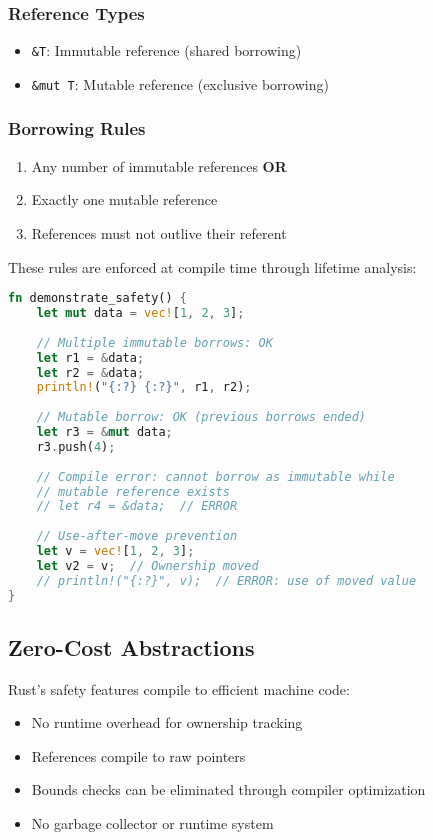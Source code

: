 \documentclass[11pt]{article}
\begin{document}
\subsubsection{Reference Types}
\begin{itemize}
    \item \texttt{\&T}: Immutable reference (shared borrowing)
    \item \texttt{\&mut T}: Mutable reference (exclusive borrowing)
\end{itemize}

\subsubsection{Borrowing Rules}
\begin{enumerate}
    \item Any number of immutable references \textbf{OR}
    \item Exactly one mutable reference
    \item References must not outlive their referent
\end{enumerate}

These rules are enforced at compile time through lifetime analysis:

\begin{lstlisting}[language=Rust,caption={Rust's compile-time safety enforcement},label={lst:rust_borrowing}]
fn demonstrate_safety() {
    let mut data = vec![1, 2, 3];
    
    // Multiple immutable borrows: OK
    let r1 = &data;
    let r2 = &data;
    println!("{:?} {:?}", r1, r2);
    
    // Mutable borrow: OK (previous borrows ended)
    let r3 = &mut data;
    r3.push(4);
    
    // Compile error: cannot borrow as immutable while
    // mutable reference exists
    // let r4 = &data;  // ERROR
    
    // Use-after-move prevention
    let v = vec![1, 2, 3];
    let v2 = v;  // Ownership moved
    // println!("{:?}", v);  // ERROR: use of moved value
}
\end{lstlisting}

\subsection{Zero-Cost Abstractions}

Rust's safety features compile to efficient machine code:
\begin{itemize}
    \item No runtime overhead for ownership tracking
    \item References compile to raw pointers
    \item Bounds checks can be eliminated through compiler optimization
    \item No garbage collector or runtime system
\end{itemize}
\end{document}
